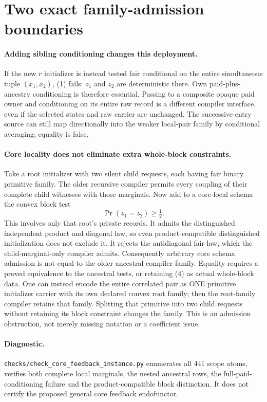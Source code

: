 \documentclass[11pt]{article}
\begin{document}
\section{Two exact family-admission boundaries}
\paragraph{Adding sibling conditioning changes this deployment.}
If the new $r$ initializer is instead tested fair conditional on the entire simultaneous tuple $(x_1,x_2)$, (1) fails: $z_1$ and $z_2$ are deterministic there. Own paid-plus-ancestry conditioning is therefore essential. Passing to a composite opaque paid owner and conditioning on its entire raw record is a different compiler interface, even if the selected states and raw carrier are unchanged. The successive-entry source can still map directionally into the weaker local-pair family by conditional averaging; equality is false.

\paragraph{Core locality does not eliminate extra whole-block constraints.}
Take a root initializer with two silent child requests, each having fair binary primitive family. The older recursive compiler permits every coupling of their complete child witnesses with those marginals. Now add to a core-local schema the convex block test
\[
                         \Pr(z_1=z_2)\ge\tfrac12.       \tag{4}
\]
This involves only that root's private records. It admits the distinguished independent product and diagonal law, so even product-compatible distinguished initialization does not exclude it. It rejects the antidiagonal fair law, which the child-marginal-only compiler admits. Consequently arbitrary core schema admission is not equal to the older ancestral compiler family. Equality requires a proved equivalence to the ancestral tests, or retaining (4) as actual whole-block data. One can instead encode the entire correlated pair as ONE primitive initializer carrier with its own declared convex root family; then the root-family compiler retains that family. Splitting that primitive into two child requests without retaining its block constraint changes the family. This is an admission obstruction, not merely missing notation or a coefficient issue.

\paragraph{Diagnostic.}
\texttt{checks/check\_core\_feedback\_instance.py} enumerates all 441 scope atoms, verifies both complete local marginals, the nested ancestral rows, the full-paid-conditioning failure and the product-compatible block distinction. It does not certify the proposed general core feedback endofunctor.
\end{document}
